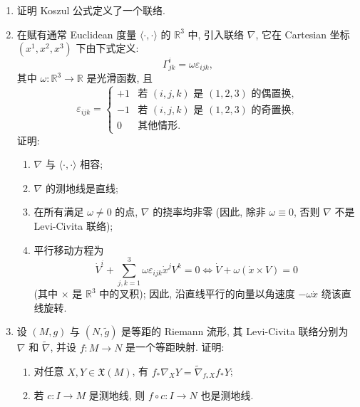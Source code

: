 \RiemannExerciseHeading
\begin{enumerate}[label=(\arabic*),ref=\arabic*,leftmargin=*]
\item\label{ex:koszul-defines-connection}
证明 Koszul 公式定义了一个联络.

\item\label{ex:euclidean-connection-with-torsion}
在赋有通常 Euclidean 度量 $\langle\cdot,\cdot\rangle$ 的 $\mathbb{R}^3$ 中, 引入联络 $\nabla$, 它在 Cartesian 坐标 $(x^1,x^2,x^3)$ 下由下式定义:
\[
  \Gamma^i_{jk}=\omega\varepsilon_{ijk},
\]
其中 $\omega:\mathbb{R}^3\to\mathbb{R}$ 是光滑函数, 且
\[
  \varepsilon_{ijk}=\begin{cases}
    +1 & \text{若 $(i,j,k)$ 是 $(1,2,3)$ 的偶置换},\\
    -1 & \text{若 $(i,j,k)$ 是 $(1,2,3)$ 的奇置换},\\
    0  & \text{其他情形}.
  \end{cases}
\]
证明:
\begin{enumerate}[label=(\alph*),leftmargin=*]
\item $\nabla$ 与 $\langle\cdot,\cdot\rangle$ 相容;
\item $\nabla$ 的测地线是直线;
\item 在所有满足 $\omega\ne 0$ 的点, $\nabla$ 的挠率均非零 (因此, 除非 $\omega\equiv 0$, 否则 $\nabla$ 不是 Levi-Civita 联络);
\item 平行移动方程为
\[
  \dot V^i+\sum_{j,k=1}^3\omega\varepsilon_{ijk}\dot x^j V^k=0
  \Leftrightarrow \dot V+\omega(\dot x\times V)=0
\]
(其中 $\times$ 是 $\mathbb{R}^3$ 中的叉积); 因此, 沿直线平行的向量以角速度 $-\omega\dot x$ 绕该直线旋转.
\end{enumerate}

\item\label{ex:isometry-preserves-levi-civita}
设 $(M,g)$ 与 $(N,\widetilde g)$ 是等距的 Riemann 流形, 其 Levi-Civita 联络分别为 $\nabla$ 和 $\widetilde\nabla$, 并设 $f:M\to N$ 是一个等距映射. 证明:
\begin{enumerate}[label=(\alph*),leftmargin=*]
\item 对任意 $X,Y\in\mathfrak{X}(M)$, 有 $f_*\nabla_XY=\widetilde\nabla_{f_*X}f_*Y$;
\item 若 $c:I\to M$ 是测地线, 则 $f\circ c:I\to N$ 也是测地线.
\end{enumerate}


\end{enumerate}
